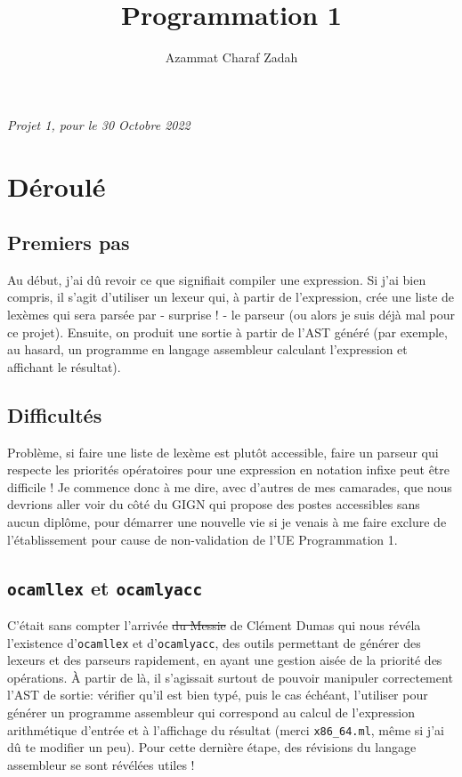 \documentclass[12pt,french]{article}
\title{Programmation 1}
\author{Azammat Charaf Zadah}
\date{}
\date{}
\begin{document}
\maketitle
\begin{center}
    \textit{Projet 1, pour le 30 Octobre 2022}
\end{center}

\section{Déroulé}
\subsection{Premiers pas}
Au début, j'ai dû revoir ce que signifiait compiler une expression. Si j'ai bien compris, il s'agit d'utiliser un lexeur qui, à partir de l'expression, crée une liste de lexèmes qui sera parsée par - surprise ! - le parseur (ou alors je suis déjà mal pour ce projet). Ensuite, on produit une sortie à partir de l'AST généré (par exemple, au hasard, un programme en langage assembleur calculant l'expression et affichant le résultat).
\subsection{Difficultés}
Problème, si faire une liste de lexème est plutôt accessible, faire un parseur qui respecte les priorités opératoires pour une expression en notation infixe peut être difficile ! Je commence donc à me dire, avec d'autres de mes camarades, que nous devrions aller voir du côté du GIGN qui propose des postes accessibles sans aucun diplôme, pour démarrer une nouvelle vie si je venais à me faire exclure de l'établissement pour cause de non-validation de l'UE Programmation 1.
\subsection{\texttt{ocamllex} et \texttt{ocamlyacc}}
C'était sans compter l'arrivée \sout{du Messie} de Clément Dumas qui nous révéla l'existence d'\texttt{ocamllex} et d'\texttt{ocamlyacc}, des outils permettant de générer des lexeurs et des parseurs rapidement, en ayant une gestion aisée de la priorité des opérations. À partir de là, il s'agissait surtout de pouvoir manipuler correctement l'AST de sortie: vérifier qu'il est bien typé, puis le cas échéant, l'utiliser pour générer un programme assembleur qui correspond au calcul de l'expression arithmétique d'entrée et à l'affichage du résultat (merci \texttt{x86\_64.ml}, même si j'ai dû te modifier un peu). Pour cette dernière étape, des révisions du langage assembleur se sont révélées utiles !
\newpage
\end{document}
